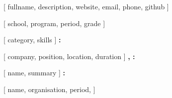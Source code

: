 \newkeycommand{\introduction}[
    fullname,
    description,
    website,
    email,
    phone,
    github
]{%
}


\newenvironment{educationSection}[1]{%
    \sectionTitle{#1}%
}%

\newkeycommand{\educationItem}[
    school,
    program,
    period,
    grade
]{%
    \textbf{} \hfill {} \\ 
     \hfill \raggedleft{} %
}


\newenvironment{skillsSection}[1]{%
    \sectionTitle{#1}%
}%

\newkeycommand{\skillItem}[
    category,
    skills
]{%
    {%
        \bf {}:
    } {%
    }
}%


\newenvironment{experienceSection}[1]{%
    \sectionTitle{#1}%
    \begin{list}{}{ %
        \setlength{\leftmargin}{0em} %
    }%
        \item[]%
    }{%
    \end{list}%
}%

\newkeycommand{\experienceItem}[
    company,
    position,
    location,
    duration
]{%
    \textbf{%
        ,
        :
        \it{}
    } \hfill {%
    }
    \vspace{-0.5em}%
}%


\newenvironment{projectSection}[1]{%
    \sectionTitle{#1}%
}%

\newkeycommand{\projectItem}[
    name,
    summary
]{%
    {%
        \bf {}:
    } {%
    }
}%


\newenvironment{awardSection}[1]{%
    \sectionTitle{#1}%
}%

\newkeycommand{\awardItem}[
    name,
    organisation,
    period,
]{%
    \textbf{} \hfill {} \\ 
}

